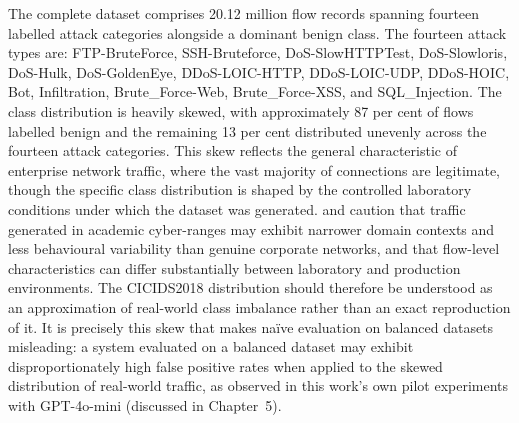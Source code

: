 \documentclass[../main.tex]{subfiles}
\begin{document}
The complete dataset comprises 20.12 million flow records spanning fourteen labelled attack categories alongside a dominant benign class. The fourteen attack types are: FTP-BruteForce, SSH-Bruteforce, DoS-SlowHTTPTest, DoS-Slowloris, DoS-Hulk, DoS-GoldenEye, DDoS-LOIC-HTTP, DDoS-LOIC-UDP, DDoS-HOIC, Bot, Infiltration, Brute\_Force-Web, Brute\_Force-XSS, and SQL\_Injection. The class distribution is heavily skewed, with approximately 87 per cent of flows labelled benign and the remaining 13 per cent distributed unevenly across the fourteen attack categories. This skew reflects the general characteristic of enterprise network traffic, where the vast majority of connections are legitimate, though the specific class distribution is shaped by the controlled laboratory conditions under which the dataset was generated. \textcite{Kenyon2020} and \textcite{Ring2019} caution that traffic generated in academic cyber-ranges may exhibit narrower domain contexts and less behavioural variability than genuine corporate networks, and that flow-level characteristics can differ substantially between laboratory and production environments. The CICIDS2018 distribution should therefore be understood as an approximation of real-world class imbalance rather than an exact reproduction of it. It is precisely this skew that makes na\"{i}ve evaluation on balanced datasets misleading: a system evaluated on a balanced dataset may exhibit disproportionately high false positive rates when applied to the skewed distribution of real-world traffic, as observed in this work's own pilot experiments with GPT-4o-mini (discussed in Chapter~5).
\end{document}
